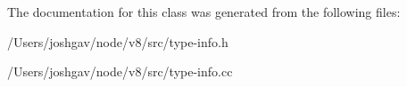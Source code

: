 The documentation for this class was generated from the following files\+:\begin{DoxyCompactItemize}
\item 
/\+Users/joshgav/node/v8/src/type-\/info.\+h\item 
/\+Users/joshgav/node/v8/src/type-\/info.\+cc\end{DoxyCompactItemize}

